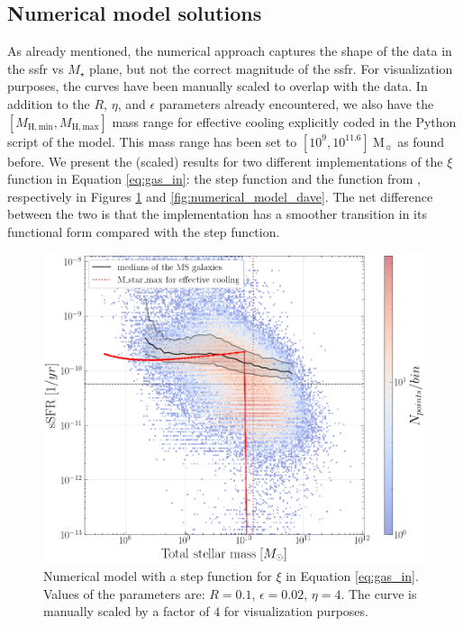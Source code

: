 \documentclass[fleqn, usenatbib]{mnras}
\begin{document}
\subsection{Numerical model solutions}

As already mentioned, the numerical approach captures the shape of the data in the \acrshort{ssfr} vs \(M_{\star}\) plane, but not the correct magnitude of the \acrshort{ssfr}. For visualization purposes, the curves have been manually scaled to overlap with the data. In addition to the \(R\), \(\eta\), and \(\epsilon\) parameters already encountered, we also have the \([M_{\mathrm{H, min}}, M_{\mathrm{H, max}}]\) mass range for effective cooling explicitly coded in the Python script of the model. This mass range has been set to \([10^9, 10^{11.6}]\ \mathrm{M_{\sun}}\) as found before. We present the (scaled) results for two different implementations of the \(\xi\) function in Equation \ref{eq:gas_in}: the step function and the function from \citet[Figure 1]{Dave2011}, respectively in Figures \ref{fig:numerical_model_step} and \ref{fig:numerical_model_dave}. The net difference between the two is that the \citeauthor{Dave2011} implementation has a smoother transition in its functional form compared with the step function.
\begin{figure}
	\includegraphics[width=\columnwidth]{images/numerical_model_step.png}
	\caption{Numerical model with a step function for \(\xi\) in Equation \ref{eq:gas_in}. Values of the parameters are: \(R = 0.1\), \(\epsilon = 0.02\), \(\eta = 4\). The curve is manually scaled by a factor of \(4\) for visualization purposes.}
	\label{fig:numerical_model_step}
\end{figure}
\end{document}
